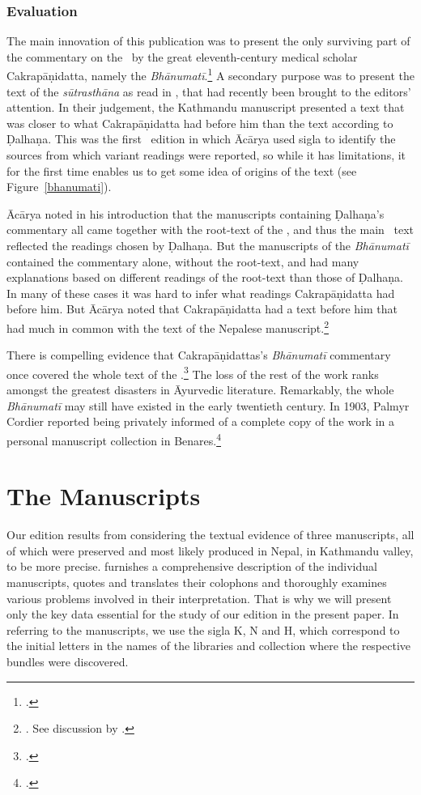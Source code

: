 \subsubsection{Evaluation}

The main innovation of this publication was to present the only surviving part of
the commentary on the \SS\ by the great eleventh-century medical scholar
Cakrapāṇidatta, namely the \emph{Bhānumatī}.\footcite[IA, 374--375 and IB,
495--496]{meul-hist} A secondary purpose was to present the text of the
\emph{sūtrasthāna} as read in , that had recently 
been
brought to the editors' attention. In their judgement, the Kathmandu manuscript
presented a text that was closer to what Cakrapāṇidatta had before him than the
text according to Ḍalhaṇa.   This was the first \SS\ edition in which Ācārya used
sigla to identify the sources from which variant readings were reported, so while
it has limitations, it for the first time enables us to get some idea of origins
of the text (see Figure~\ref{bhanumati}).

Ācārya noted in his introduction that the manuscripts containing  Ḍalhaṇa's
commentary all came together with the root-text of the \SS, and thus the main \SS\
text reflected the readings chosen by Ḍalhaṇa.  But the manuscripts of the
\emph{Bhānumatī} contained the commentary alone, without the root-text, and 
had
many explanations based on different readings of the root-text than those of
Ḍalhaṇa.  In many of these cases it was hard to infer what readings 
Cakrapāṇidatta had before him. But Ācārya noted that Cakrapāṇidatta had a text
before him that had much in common with the text of the Nepalese
manuscript.\footnote{\cite[3--4]{acar-1939}.  See discussion by
\citet[7]{kleb-2021a}.}  

There is compelling evidence that Cakrapāṇidattas's \emph{Bhānumatī} 
commentary
once covered the whole text of the \SS.\footcite[IA, 375]{meul-hist}  The loss of
the rest of the work ranks amongst the greatest disasters in Āyurvedic
literature.  Remarkably, the whole \emph{Bhānumatī} may still have existed in the
early twentieth century. In 1903, Palmyr Cordier reported being privately informed
of a complete copy of the work in a personal manuscript collection in
Benares.\footcite[332]{cord-1903}


\section{The Manuscripts}
Our edition results from considering the textual evidence of three manuscripts, all of which were preserved and most likely produced in Nepal, in Kathmandu valley, to be more precise. \textcites[\S 
2.1]{kleb-2021b} furnishes a comprehensive description of the individual manuscripts, quotes and translates their colophons and thoroughly examines various problems involved in their interpretation. That is why we will present only the key data essential for the study of our edition in the present paper.
In referring to the manuscripts, we use the sigla K, N and H, which correspond to the initial letters in the names of the libraries and collection where the respective bundles were discovered.

